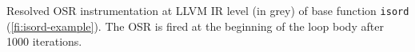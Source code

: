 \label{fig:isordfrom} Resolved OSR instrumentation at LLVM IR level (in grey) of base function {\tt isord} (\myfigure\ref{fi:isord-example}). The OSR is fired at the beginning of the loop body after 1000 iterations.
